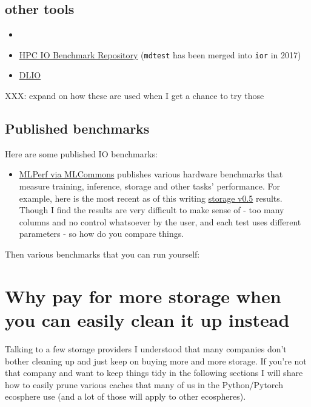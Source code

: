 \documentclass[
]{report}
\providecommand{\tightlist}{%
  \setlength{\itemsep}{0pt}\setlength{\parskip}{0pt}}\usepackage{longtable,booktabs,array}
\begin{document}
\subsection{other tools}\label{other-tools}

\begin{itemize}
\tightlist
\item
\item
  \href{https://github.com/hpc/ior}{HPC IO Benchmark Repository}
  (\texttt{mdtest} has been merged into \texttt{ior} in 2017)
\item
  \href{https://github.com/argonne-lcf/dlio_benchmark}{DLIO}
\end{itemize}

XXX: expand on how these are used when I get a chance to try those

\subsection{Published benchmarks}\label{published-benchmarks}

Here are some published IO benchmarks:

\begin{itemize}
\tightlist
\item
  \href{https://mlcommons.org/}{MLPerf via MLCommons} publishes various
  hardware benchmarks that measure training, inference, storage and
  other tasks' performance. For example, here is the most recent as of
  this writing \href{https://mlcommons.org/benchmarks/storage/}{storage
  v0.5} results. Though I find the results are very difficult to make
  sense of - too many columns and no control whatsoever by the user, and
  each test uses different parameters - so how do you compare things.
\end{itemize}

Then various benchmarks that you can run yourself:

\section{Why pay for more storage when you can easily clean it up
instead}\label{why-pay-for-more-storage-when-you-can-easily-clean-it-up-instead}

Talking to a few storage providers I understood that many companies
don't bother cleaning up and just keep on buying more and more storage.
If you're not that company and want to keep things tidy in the following
sections I will share how to easily prune various caches that many of us
in the Python/Pytorch ecosphere use (and a lot of those will apply to
other ecospheres).
\end{document}
